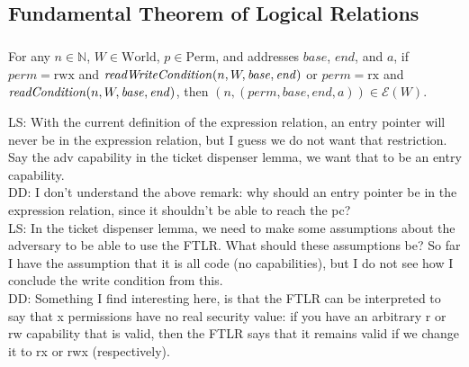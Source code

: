 \documentclass{article}
\newcommand{\forcenewline}{$\phantom{v}$\\}
\newcommand\lau[1]{{\color{purple} \sf \footnotesize {LS: #1}}\\}
\newcommand\dominique[1]{{\color{purple} \sf \footnotesize {DD: #1}}\\}
\newcommand{\var}[1]{\mathit{#1}}
\newcommand{\perm}{\var{perm}}
\newcommand{\plainfun}[2]{
  \ifthenelse{\equal{#2}{}}
             {\mathit{#1}}
             {\mathit{#1}(#2)}
}
\newcommand{\readCond}[1]{\plainfun{readCondition}{#1}}
\newcommand{\writeCond}[1]{\plainfun{readWriteCondition}{#1}}
\newcommand{\asmType}{\plaindom{AsmType}}
\newcommand{\plaindom}[1]{\mathrm{#1}}
\newcommand{\nats}{\mathbb{N}}
\newcommand{\Perms}{\plaindom{Perm}}
\newcommand{\Worlds}{\plaindom{World}}
\newcommand{\intr}[2]{\mathcal{#1}}
\newcommand{\exprintr}[1]{\intr{E}{#1}}
\newcommand{\stder}{\exprintr{\asmType}}
\newcommand{\npair}[2][n]{\left(#1,#2 \right)}
\newcommand{\plainperm}[1]{\mathrm{#1}}
\newcommand{\exec}{\plainperm{rx}}
\newcommand{\rwx}{\plainperm{rwx}}
\begin{document}
\subsection{Fundamental Theorem of Logical Relations}
\begin{lemma} \forcenewline
  For any $n \in \nats$, $W \in \Worlds$, $p\in \Perms$, and addresses $\var{base}$, $\var{end}$, and $a$, if $\perm = \rwx$ and $\writeCond{n,W,\var{base},\var{end}}$ or $\perm = \exec$ and $\readCond{n,W,\var{base},\var{end}}$, then $\npair{(\perm, \var{base}, \var{end}, a)} \in \stder(W)$.
\end{lemma} %
\lau{With the current definition of the expression relation, an entry pointer will never be in the expression relation, but I guess we do not want that restriction. Say the adv capability in the ticket dispenser lemma, we want that to be an entry capability.}
\dominique{I don't understand the above remark: why should an entry pointer be
  in the expression relation, since it shouldn't be able to reach the pc?}
\lau{In the ticket dispenser lemma, we need to make some assumptions about the adversary to be able to use the FTLR. What should these assumptions be? So far I have the assumption that it is all code (no capabilities), but I do not see how I conclude the write condition from this.}
\dominique{Something I find interesting here, is that the FTLR can be interpreted to say that x permissions have no real security value: if you have an arbitrary r or rw capability that is valid, then the FTLR says that it remains valid if we change it to rx or rwx (respectively).}
\end{document}

